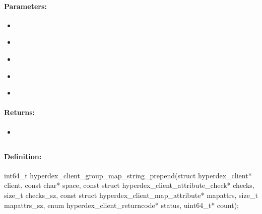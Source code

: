 \paragraph{Parameters:}
\begin{itemize}[noitemsep]
\item {}\\

\item {}\\

\item {}\\

\item {}\\

\item {}\\

\end{itemize}

\paragraph{Returns:}
\begin{itemize}[noitemsep]
\item {}\\

\end{itemize}

\pagebreak
\subsection{}
\label{api:c:group_map_string_prepend}


\paragraph{Definition:}
\begin{ccode}
int64_t hyperdex_client_group_map_string_prepend(struct hyperdex_client* client,
        const char* space,
        const struct hyperdex_client_attribute_check* checks, size_t checks_sz,
        const struct hyperdex_client_map_attribute* mapattrs, size_t mapattrs_sz,
        enum hyperdex_client_returncode* status,
        uint64_t* count);
\end{ccode}

